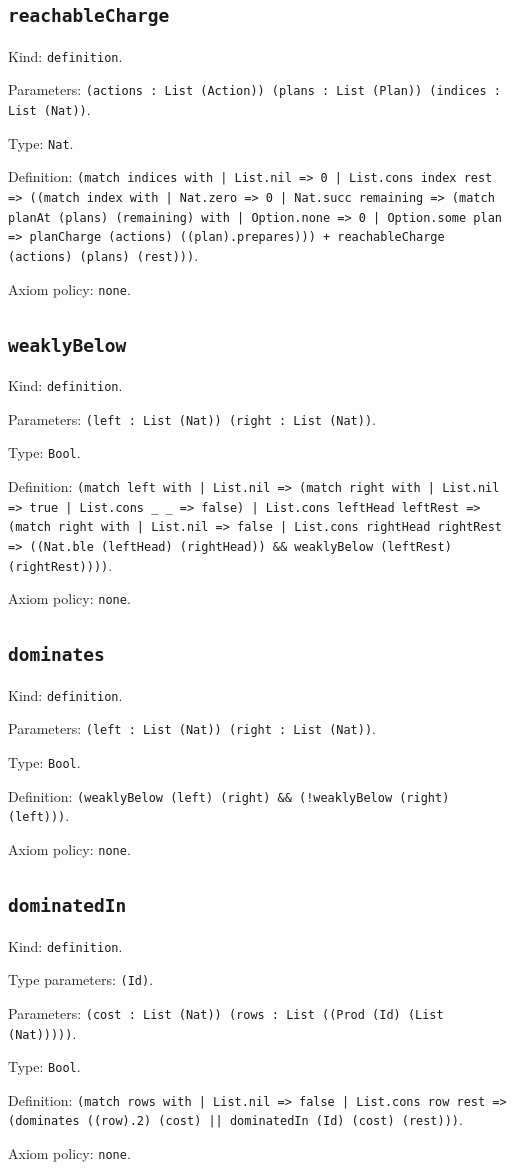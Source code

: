 \documentclass[11pt]{article}
\begin{document}
\subsection*{\texttt{reachableCharge}}
\noindent Kind: \texttt{definition}.\par
\noindent Parameters: \texttt{(actions : List (Action)) (plans : List (Plan)) (indices : List (Nat))}.\par
\noindent Type: \texttt{Nat}.\par
\noindent Definition: \texttt{(match indices with | List.nil => 0 | List.cons index rest => ((match index with | Nat.zero => 0 | Nat.succ remaining => (match planAt (plans) (remaining) with | Option.none => 0 | Option.some plan => planCharge (actions) ((plan).prepares))) + reachableCharge (actions) (plans) (rest)))}.\par
\noindent Axiom policy: \texttt{none}.\par
\subsection*{\texttt{weaklyBelow}}
\noindent Kind: \texttt{definition}.\par
\noindent Parameters: \texttt{(left : List (Nat)) (right : List (Nat))}.\par
\noindent Type: \texttt{Bool}.\par
\noindent Definition: \texttt{(match left with | List.nil => (match right with | List.nil => true | List.cons \_ \_ => false) | List.cons leftHead leftRest => (match right with | List.nil => false | List.cons rightHead rightRest => ((Nat.ble (leftHead) (rightHead)) \&\& weaklyBelow (leftRest) (rightRest))))}.\par
\noindent Axiom policy: \texttt{none}.\par
\subsection*{\texttt{dominates}}
\noindent Kind: \texttt{definition}.\par
\noindent Parameters: \texttt{(left : List (Nat)) (right : List (Nat))}.\par
\noindent Type: \texttt{Bool}.\par
\noindent Definition: \texttt{(weaklyBelow (left) (right) \&\& (!weaklyBelow (right) (left)))}.\par
\noindent Axiom policy: \texttt{none}.\par
\subsection*{\texttt{dominatedIn}}
\noindent Kind: \texttt{definition}.\par
\noindent Type parameters: \texttt{(Id)}.\par
\noindent Parameters: \texttt{(cost : List (Nat)) (rows : List ((Prod (Id) (List (Nat)))))}.\par
\noindent Type: \texttt{Bool}.\par
\noindent Definition: \texttt{(match rows with | List.nil => false | List.cons row rest => (dominates ((row).2) (cost) || dominatedIn (Id) (cost) (rest)))}.\par
\noindent Axiom policy: \texttt{none}.\par
\end{document}
